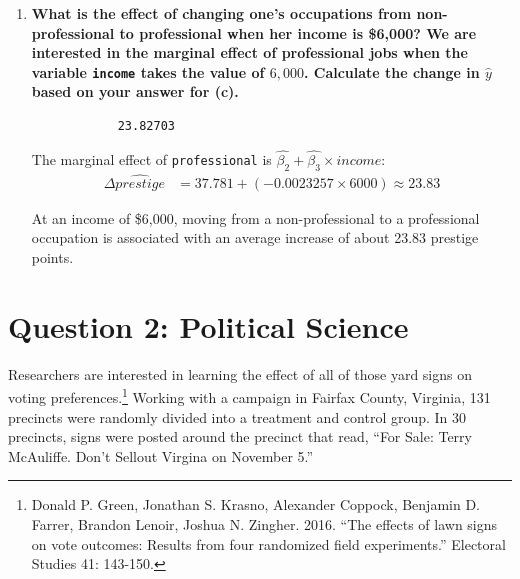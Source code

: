 \documentclass[12pt,letterpaper]{article}
\begin{document}
\begin{enumerate}
			
			
			
			\begin{verbatim}
				0.8452
			\end{verbatim}
		
		The marginal effect of income is $\hat{\beta_1}+\hat{\beta_3}$:
			\begin{align*}
				\Delta \widehat{prestige} &= (0.0031709 - 0.0023257) \times 1000 \approx 0.845
			\end{align*}
			
		For professionals, a \$1,000 increase in income is associated with an average increase of about 0.85 prestige points, much smaller than the 3.17 points for non-professionals.
		
	\vspace{1cm}
	\item [(g)]
	\textbf{What is the effect of changing one's occupations from non-professional to professional when her income is \$6,000? We are interested in the marginal effect of professional jobs when the variable \texttt{income} takes the value of $6,000$. Calculate the change in $\hat{y}$ based on your answer for (c).} \\
		
		
		
		\begin{verbatim}
			23.82703
		\end{verbatim}
		
		The marginal effect of \texttt{professional} is $\hat{\beta_2}+\hat{\beta_3}\times income$:
		\begin{align*}
			\Delta \widehat{prestige} &= 37.781 + (-0.0023257 \times 6000) \approx 23.83
		\end{align*}
		
		At an income of \$6,000, moving from a non-professional to a professional occupation is associated with an average increase of about 23.83 prestige points.
	
	
\end{enumerate}

\newpage

\section*{Question 2: Political Science}
\vspace{.25cm}
\noindent 	Researchers are interested in learning the effect of all of those yard signs on voting preferences.\footnote{Donald P. Green, Jonathan	S. Krasno, Alexander Coppock, Benjamin D. Farrer,	Brandon Lenoir, Joshua N. Zingher. 2016. ``The effects of lawn signs on vote outcomes: Results from four randomized field experiments.'' Electoral Studies 41: 143-150. } Working with a campaign in Fairfax County, Virginia, 131 precincts were randomly divided into a treatment and control group. In 30 precincts, signs were posted around the precinct that read, ``For Sale: Terry McAuliffe. Don't Sellout Virgina on November 5.'' \\
\end{document}
